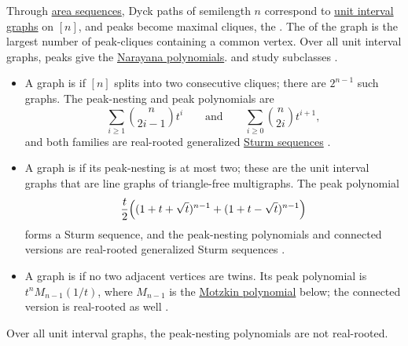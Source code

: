 \begin{example*}
\label{unitIntervalPeaksRealRooted}
Through \hyperref[areaSequence]{area sequences}, Dyck paths of semilength
$n$ correspond to \hyperref[unitIntervalGraph]{unit interval graphs} on
$[n]$, and peaks become maximal cliques, the .  The
 of the graph is the largest number of peak-cliques
containing a common vertex.  Over all unit interval graphs, peaks give the
\hyperref[narayanaPolynomialFamiliesRealRooted]{Narayana polynomials}.
 and  study
subclasses \cite{AlexanderssonLeite2026Peaks}.
\begin{itemize}
\item A graph is  if $[n]$ splits into two consecutive
 cliques; there are $2^{n-1}$ such graphs.  The peak-nesting and peak
 polynomials are
 \[
  \sum_{i\geq1}\binom{n}{2i-1}t^i
  \qquad\text{and}\qquad
  \sum_{i\geq0}\binom{n}{2i}t^{i+1},
 \]
 and both families are real-rooted generalized
 \hyperref[sturmSequence]{Sturm sequences}
 \cite[Thms.~4.3 and~4.9, Cors.~4.5 and~4.10]{AlexanderssonLeite2026Peaks}.
\item A graph is  if its peak-nesting is at most two;
 these are the unit interval graphs that are line graphs of triangle-free
 multigraphs.  The peak polynomial
 \[
  \frac{t}{2}\Bigl((1+t+\sqrt t)^{n-1}+(1+t-\sqrt t)^{n-1}\Bigr)
 \]
 forms a Sturm sequence, and the peak-nesting polynomials and connected
 versions are real-rooted generalized Sturm sequences
 \cite[Thm.~5.6, Cors.~5.5, 5.7 and~5.9]{AlexanderssonLeite2026Peaks}.
\item A graph is  if no two adjacent vertices are twins.
 Its peak polynomial is $t^n M_{n-1}(1/t)$, where $M_{n-1}$ is the
 \hyperref[motzkinPolynomialsRealRooted]{Motzkin polynomial} below; the
 connected version is real-rooted as well
 \cite[Thm.~6.10, Cor.~6.14]{AlexanderssonLeite2026Peaks}.
\end{itemize}
Over all unit interval graphs, the peak-nesting polynomials are not
real-rooted.
\end{example*}



